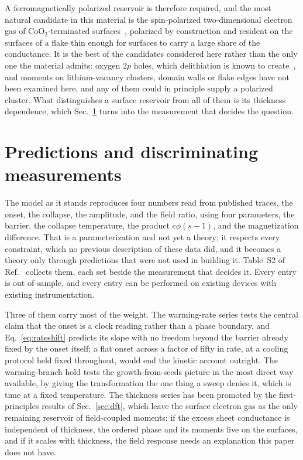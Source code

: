 \documentclass[reprint,twocolumn,prb,amsmath,amssymb,superscriptaddress,floatfix]{revtex4-2}
\begin{document}
A ferromagnetically polarized reservoir is therefore required, and the most natural candidate in
this material is the spin-polarized two-dimensional electron gas of CoO$_2$-terminated
surfaces~\cite{Radha2021}, polarized by construction and resident on the surfaces of a flake
thin enough for surfaces to carry a large share of the conductance. It is the best of the
candidates considered here rather than the only one the material admits: oxygen $2p$ holes,
which delithiation is known to create~\cite{Salagre2023}, and moments on lithium-vacancy
clusters, domain walls or flake edges have not been examined here, and any of them could in
principle supply a polarized cluster. What distinguishes a surface reservoir from all of them is
its thickness dependence, which Sec.~\ref{sec:tests} turns into the measurement that decides the
question.

\section{Predictions and discriminating measurements}
\label{sec:tests}

The model as it stands reproduces four numbers read from published traces, the onset, the
collapse, the amplitude, and the field ratio, using four parameters, the barrier, the collapse
temperature, the product $c\phi(s-1)$, and the magnetization difference. That is a
parameterization and not yet a theory; it respects every
constraint, which no previous description of these data did, and it becomes a theory only
through predictions that were not used in building it.
Table~S2 of Ref.~\cite{SM} collects them, each set beside the measurement that decides it. Every
entry is out of sample, and every entry can be performed on existing devices with existing
instrumentation.

Three of them carry most of the weight. The warming-rate series tests the central claim
that the onset is a clock reading rather than a phase boundary, and Eq.~\eqref{eq:rateshift}
predicts its slope with no freedom beyond the barrier already fixed by the onset itself; a flat
onset across a factor of fifty in rate, at a cooling protocol held fixed throughout, would end
the kinetic account outright. The warming-branch hold tests the growth-from-seeds picture in the
most direct way available, by giving the transformation the one thing a sweep denies it, which
is time at a fixed temperature. The thickness series has been promoted
by the first-principles results of Sec.~\ref{sec:dft}, which leave the surface electron gas as
the only remaining reservoir of field-coupled moments: if the excess sheet conductance is
independent of thickness, the ordered phase and its moments live on the surfaces, and if it
scales with thickness, the field response needs an explanation this paper does not have.
\end{document}
